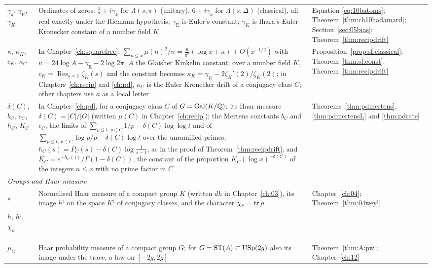 {\begin{longtable}{p{0.8in}p{2.65in}p{0.95in}}
\raggedright $\gamma_k$, $\gamma_{\mathrm E}$, $\gamma_K$ & \raggedright Ordinates of zeros: $\frac12\pm i\gamma_k$ for $\Lambda(s,\pi)$ (unitary), $6\pm i\gamma_k$ for $\Lambda(s,\Delta)$ (classical), all real exactly under the Riemann hypothesis; $\gamma_{\mathrm E}$ is Euler's constant; $\gamma_K$ is Ihara's Euler Kronecker constant of a number field $K$ & \raggedright Equation \eqref{eq:10batoms}; Theorem~\ref{thm:ch10hadamard}; Section~\ref{sec:05bias}; Theorem~\ref{thm:recipdrift}\tabularnewline[1pt]
\raggedright $\kappa$, $\kappa_K$, $c_K$, $\kappa_C$ & \raggedright In Chapter~\ref{ch:squarefree}, $\sum_{n\le x}\mu(n)^2/n=\frac6{\pi^2}(\log x+\kappa)+O(x^{-1/2})$ with $\kappa=24\log A-\gamma_{\mathrm E}-2\log2\pi$, $A$ the Glaisher Kinkelin constant; over a number field $K$, $c_K=\operatorname{Res}_{s=1}\zeta_K(s)$ and the constant becomes $\kappa_K=\gamma_K-2\zeta_K'(2)/\zeta_K(2)$; in Chapters~\ref{ch:recip} and \ref{ch:pd}, $\kappa_C$ is the Euler Kronecker drift of a conjugacy class $C$; other chapters use $\kappa$ as a local letter & \raggedright Proposition~\ref{prop:sf:classical}; Theorem~\ref{thm:sf:const}; Theorem~\ref{thm:recipdrift}\tabularnewline[1pt]
\raggedright $\delta(C)$, $b_C$, $c_C$, $h_C$, $K_C$ & \raggedright In Chapter~\ref{ch:pd}, for a conjugacy class $C$ of $G=\operatorname{Gal}(K/\mathbb{Q})$: its Haar measure $\delta(C)=|C|/|G|$ (written $\mu(C)$ in Chapter~\ref{ch:recip}); the Mertens constants $b_C$ and $c_C$, the limits of $\sum_{p\le t,\,p\in C}1/p-\delta(C)\log\log t$ and of $\sum_{p\le t,\,p\in C}\log p/p-\delta(C)\log t$ over the unramified primes; $h_C(s)=P_C(s)-\delta(C)\log\frac1{s-1}$, as in the proof of Theorem~\ref{thm:recipdrift}; and $K_C=e^{-h_C(1)}/\Gamma(1-\delta(C))$, the constant of the proportion $K_C(\log x)^{-\delta(C)}$ of the integers $n\le x$ with no prime factor in $C$ & \raggedright Theorems~\ref{thm:pdmertens}, \ref{thm:pdmertensL} and \ref{thm:pdrate}\tabularnewline[1pt]
\midrule
\multicolumn{3}{l}{\textit{Groups and Haar measure}}\\*
\raggedright $h$, $h^\natural$, $\chi_\rho$ & \raggedright Normalised Haar measure of a compact group $K$ (written $dh$ in Chapter~\ref{ch:03}), its image $h^\natural$ on the space $K^\natural$ of conjugacy classes, and the character $\chi_\rho=\operatorname{tr}\rho$ & \raggedright Chapter~\ref{ch:04}; Theorem~\ref{thm:04weyl}\tabularnewline[1pt]
\raggedright $\mu_G$ & \raggedright Haar probability measure of a compact group $G$; for $G=\mathrm{ST}(A)\subset\mathrm{USp}(2g)$ also its image under the trace, a law on $[-2g,2g]$ & \raggedright Theorem~\ref{thm:A:pw}; Chapter~\ref{ch:12}\tabularnewline[1pt]

\end{longtable}}
